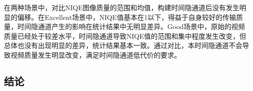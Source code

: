 在两种场景中，对比NIQE图像质量的范围和均值，构建时间隐通道后没有发生明显的偏移。在Excellent场景中，NIQE值基本在1以下，得益于自身较好的传输质量，时间隐通道产生的影响在统计结果中无明显差异。Good场景中，原始的视频质量已经处于较差水平，时间隐通道导致NIQE值的范围和集中程度发生改变，但总体也没有出现明显的差异，统计结果基本一致。通过对比，本时间隐通道不会导致视频质量发生明显改变，满足时间隐通道低代价的要求。

\subsection{结论}
\label{chap:zigzag:results:conclusion}


